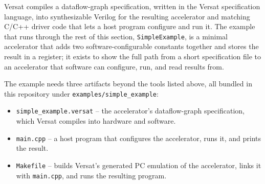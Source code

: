 %

Versat compiles a dataflow-graph specification, written in the Versat specification language, into synthesizable Verilog for the resulting accelerator and matching C/C++ driver code that lets a host program configure and run it. The example that runs through the rest of this section, \texttt{SimpleExample}, is a minimal accelerator that adds two software-configurable constants together and stores the result in a register; it exists to show the full path from a short specification file to an accelerator that software can configure, run, and read results from.

The example needs three artifacts beyond the tools listed above, all bundled in this repository under \texttt{examples/simple\_example}:

\begin{itemize}
  \itemsep-0.5em
  \item \texttt{simple\_example.versat} -- the accelerator's dataflow-graph specification, which Versat compiles into hardware and software.
  \item \texttt{main.cpp} -- a host program that configures the accelerator, runs it, and prints the result.
  \item \texttt{Makefile} -- builds Versat's generated PC emulation of the accelerator, links it with \texttt{main.cpp}, and runs the resulting program.
\end{itemize}
